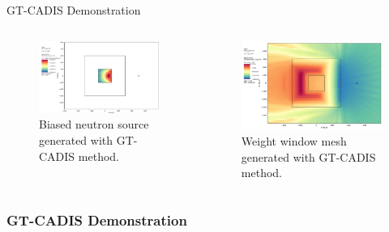 \documentclass{beamer}
\begin{document}
\begin{frame}{GT-CADIS Demonstration}
\begin{columns}
\begin{figure} 
	\includegraphics[scale=0.15]{biased_n_src.png}
	\caption [GT-CADIS biased neutron source] 
	{Biased neutron source generated with GT-CADIS method.\label{fig:ex.biased_src}}
\end{figure}
\begin{figure} 
	\includegraphics[scale=0.1]{gtcadis_wwn.png}
	\caption [GT-CADIS weight window mesh]
	{Weight window mesh generated with GT-CADIS method.\label{fig:ex.wwinp}}
\end{figure}

	\end{columns}
\end{frame}

\begin{frame}
\frametitle{GT-CADIS Demonstration}

%

\end{frame}
 
\end{document}
